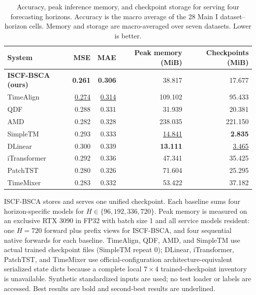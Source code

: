 \documentclass[10pt]{article}
\begin{document}
\begin{table}[H]
\centering
\caption{Accuracy, peak inference memory, and checkpoint storage for serving four forecasting horizons. Accuracy is the macro average of the 28 Main I dataset--horizon cells. Memory and storage are macro-averaged over seven datasets. Lower is better.}
\label{tab:iscf-bsca-efficiency}
\small
\setlength{\tabcolsep}{7pt}
\begin{tabular}{lrrrr}
\toprule
System & MSE & MAE & Peak memory (MiB) & Checkpoints (MiB) \\
\midrule
\textbf{ISCF-BSCA (ours)} & \textbf{0.261} & \textbf{0.306} & 38.817 & 17.677 \\
TimeAlign & \underline{0.274} & \underline{0.314} & 109.102 & 95.433 \\
QDF & 0.288 & 0.331 & 31.939 & 20.381 \\
AMD & 0.282 & 0.328 & 238.035 & 221.150 \\
SimpleTM & 0.293 & 0.333 & \underline{14.841} & \textbf{2.835} \\
DLinear & 0.300 & 0.339 & \textbf{13.111} & \underline{3.465} \\
iTransformer & 0.292 & 0.336 & 47.341 & 35.425 \\
PatchTST & 0.280 & 0.326 & 71.604 & 25.295 \\
TimeMixer & 0.283 & 0.332 & 53.422 & 37.182 \\
\bottomrule
\end{tabular}
\vspace{2pt}
\parbox{0.98\linewidth}{\footnotesize ISCF-BSCA stores and serves one unified checkpoint. Each baseline sums four horizon-specific models for $H\in\{96,192,336,720\}$. Peak memory is measured on an exclusive RTX 3090 in FP32 with batch size 1 and all service models resident: one $H=720$ forward plus prefix views for ISCF-BSCA, and four sequential native forwards for each baseline. TimeAlign, QDF, AMD, and SimpleTM use actual trained checkpoint files (SimpleTM repeat 0); DLinear, iTransformer, PatchTST, and TimeMixer use official-configuration architecture-equivalent serialized state dicts because a complete local $7\times4$ trained-checkpoint inventory is unavailable. Synthetic standardized inputs are used; no test loader or labels are accessed. Best results are bold and second-best results are underlined.}
\end{table}
\end{document}
